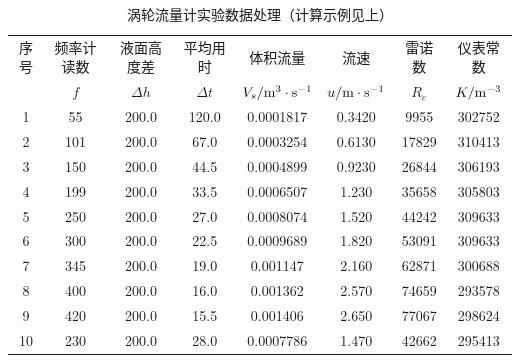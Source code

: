 \documentclass[UTF8,AutoFakeBold,a4paper]{article}
\begin{document}
\begin{table}[h]
		\centering
		\begin{tabular}{cccccccc}
		\toprule
		
 序号 & 频率计读数 & 液面高度差 & 平均用时 & 体积流量 & 流速 & 雷诺数 & 仪表常数 \\ 
 &$f$&$\Delta h$&$\Delta t$&$V_{s}/\rm{m}^{3}\cdot\rm{s}^{-1}$&$u/\rm{m}\cdot\rm{s}^{-1}$&$R_{e}$&$K/\rm{m}^{-3}$\\
 \midrule
        1 & 55 & 200.0 & 120.0 & 0.0001817 & 0.3420 & 9955 & 302752 \\ 
        2 & 101 & 200.0 & 67.0 & 0.0003254 & 0.6130 & 17829 & 310413 \\ 
        3 & 150 & 200.0 & 44.5 & 0.0004899 & 0.9230 & 26844 & 306193 \\ 
        4 & 199 & 200.0 & 33.5 & 0.0006507 & 1.230 & 35658 & 305803 \\ 
        5 & 250 & 200.0 & 27.0 & 0.0008074 & 1.520 & 44242 & 309633 \\ 
        6 & 300 & 200.0 & 22.5 & 0.0009689 & 1.820 & 53091 & 309633 \\ 
        7 & 345 & 200.0 & 19.0 & 0.001147 & 2.160 & 62871 & 300688 \\ 
        8 & 400 & 200.0 & 16.0 & 0.001362 & 2.570 & 74659 & 293578 \\ 
        9 & 420 & 200.0 & 15.5 & 0.001406 & 2.650 & 77067 & 298624 \\ 
        10 & 230 & 200.0 & 28.0 & 0.0007786 & 1.470 & 42662 & 295413 \\ 
		\bottomrule
		\end{tabular}	
		\label{ta1}
		\caption{涡轮流量计实验数据处理（计算示例见上）}
\end{table}


\newpage
\end{document}
